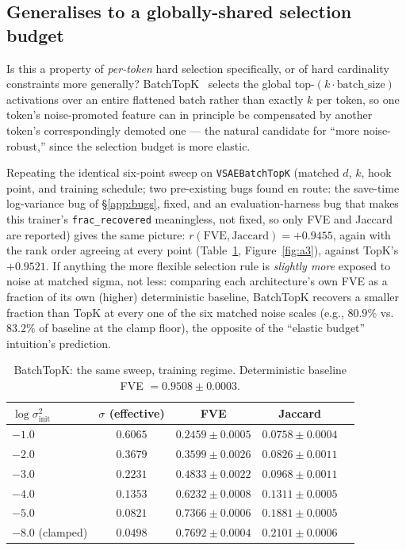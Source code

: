 \documentclass[11pt]{article}
\begin{document}
\subsection{Generalises to a globally-shared selection budget}

Is this a property of \emph{per-token} hard selection specifically, or of
hard cardinality constraints more generally? BatchTopK~\citep{bussmann2024batchtopk}
selects the global top-$(k\cdot\mathrm{batch\_size})$ activations over an
entire flattened batch rather than exactly $k$ per token, so one token's
noise-promoted feature can in principle be compensated by another token's
correspondingly demoted one --- the natural candidate for ``more
noise-robust,'' since the selection budget is more elastic.

Repeating the identical six-point sweep on \texttt{VSAEBatchTopK} (matched
$d$, $k$, hook point, and training schedule; two pre-existing bugs found
en route: the save-time log-variance bug of \S\ref{app:bugs}, fixed, and an
evaluation-harness bug that makes this trainer's \texttt{frac\_recovered}
meaningless, not fixed, so only FVE and Jaccard are reported) gives the
same picture: $r(\mathrm{FVE},\mathrm{Jaccard}) = +0.9455$, again with the rank
order agreeing at every point (Table~\ref{tab:a3}, Figure~\ref{fig:a3}),
against TopK's $+0.9521$. If anything the more flexible selection rule is
\emph{slightly more} exposed to noise at matched sigma, not less: comparing
each architecture's own FVE as a fraction of its own (higher) deterministic
baseline, BatchTopK recovers a smaller fraction than TopK at every one of the
six matched noise scales (e.g., $80.9\%$ vs.\ $83.2\%$ of baseline at the
clamp floor), the opposite of the ``elastic budget'' intuition's prediction.

\begin{table}[h]
\centering
\caption{BatchTopK: the same sweep, training regime. Deterministic baseline
FVE $=0.9508\pm0.0003$.}
\label{tab:a3}
\begin{tabular}{lcccc}
\toprule
$\log\sigma^2_{\mathrm{init}}$ & $\sigma$ (effective) & FVE & Jaccard \\
\midrule
$-1.0$ & $0.6065$ & $0.2459 \pm 0.0005$ & $0.0758 \pm 0.0004$ \\
$-2.0$ & $0.3679$ & $0.3599 \pm 0.0026$ & $0.0826 \pm 0.0011$ \\
$-3.0$ & $0.2231$ & $0.4833 \pm 0.0022$ & $0.0968 \pm 0.0011$ \\
$-4.0$ & $0.1353$ & $0.6232 \pm 0.0008$ & $0.1311 \pm 0.0005$ \\
$-5.0$ & $0.0821$ & $0.7366 \pm 0.0006$ & $0.1881 \pm 0.0005$ \\
$-8.0$ (clamped) & $0.0498$ & $0.7692 \pm 0.0004$ & $0.2101 \pm 0.0006$ \\
\bottomrule
\end{tabular}
\end{table}
\end{document}

